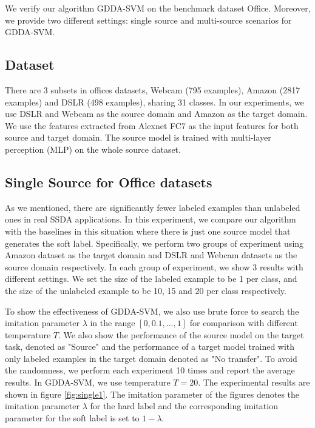 We verify our algorithm GDDA-SVM on the benchmark dataset Office. Moreover, we provide two different settings: single source and multi-source scenarios for GDDA-SVM.
\subsection{Dataset}
There are 3 subsets in offices datasets, Webcam (795 examples), Amazon (2817 examples) and DSLR (498 examples), sharing 31 classes. In our experiments, we use DSLR and Webcam as the source domain and Amazon as the target domain.
We use the features extracted from Alexnet \cite{KrizhevskyNIPS12} FC7 as the input features for both source and target domain. The source model is trained with multi-layer perception (MLP) on the whole source dataset. 

\subsection{Single Source for Office datasets}
As we mentioned, there are significantly fewer labeled examples than unlabeled ones in real SSDA applications. In this experiment, we compare our algorithm with the baselines in this situation where there is just one source model that generates the soft label. Specifically, we perform two groups of experiment using Amazon dataset as the target domain and DSLR and Webcam datasets as the source domain respectively. In each group of experiment, we show 3 results with different settings. We set the size of the labeled example to be 1 per class, and the size of the unlabeled example to be 10, 15 and 20 per class respectively.

To show the effectiveness of GDDA-SVM, we also use brute force to search the imitation parameter $\lambda$ in the range $[0,0.1,...,1]$ for comparison with different temperature $T$. We also show the performance of the source model on the target task, denoted as "Source" and the performance of a target model trained with only labeled examples in the target domain denoted as "No transfer". To avoid the randomness, we perform each experiment 10 times and report the average results. In GDDA-SVM, we use temperature $T=20$. The experimental results are shown in figure \ref{fig:single1}. The imitation parameter of the figures denotes the imitation parameter $\lambda$ for the hard label and the corresponding imitation parameter for the soft label is set to $1-\lambda$.

